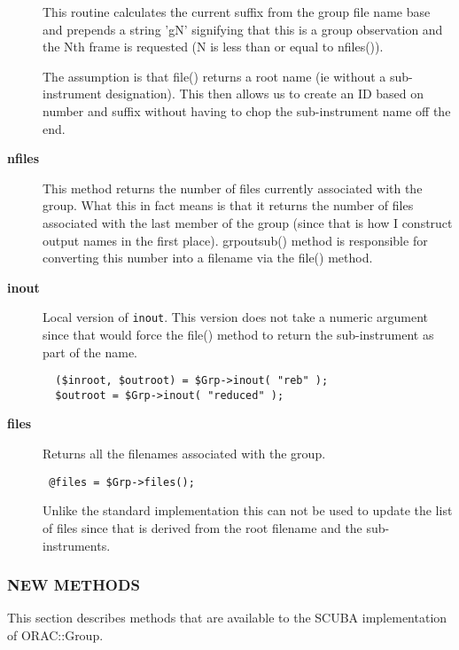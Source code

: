 \begin{description}
This routine calculates the current suffix from the group file
name base and prepends a string 'gN' signifying that this is
a group observation and the Nth frame is requested (N is less than
or equal to nfiles()).



The assumption is that file() returns a root name (ie without
a sub-instrument designation). This then allows us to create an
ID based on number and suffix without having to chop the
sub-instrument name off the end.


\item[{\textbf{nfiles}}] \mbox{}

This method returns the number of files currently associated
with the group. What this in fact means is that it returns
the number of files associated with the last member of the
group (since that is how I construct output names in the
first place). grpoutsub() method is responsible for
converting this number into a filename via the file() method.


\item[{\textbf{inout}}] \mbox{}

Local version of \texttt{inout}. This version does not take a numeric argument
since that would force the file() method to return the sub-instrument as
part of the name.

\begin{verbatim}
  ($inroot, $outroot) = $Grp->inout( "reb" );
  $outroot = $Grp->inout( "reduced" );
\end{verbatim}

\item[{\textbf{files}}] \mbox{}

Returns all the filenames associated with the group.

\begin{verbatim}
 @files = $Grp->files();
\end{verbatim}


Unlike the standard implementation this can not be used to update the list
of files since that is derived from the root filename and the sub-instruments.

\end{description}
\subsubsection*{NEW METHODS\label{ORAC::Group::SCUBA_NEW_METHODS}}


This section describes methods that are available to the
SCUBA implementation of ORAC::Group.

